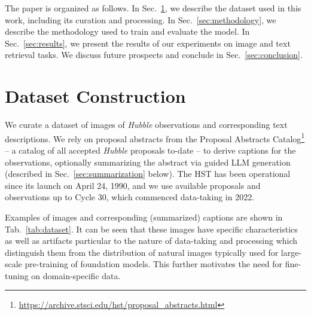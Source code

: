 \documentclass[10pt]{article} %
\newcommand{\SM}[1]{\textcolor{blue}{[SM: #1]}}
\newcommand{\hubble}{\emph{Hubble}\xspace}
\newcommand{\datafolder}[1]{\def\thedatafolder{#1}}
\begin{document}

The paper is organized as follows.
%
In Sec.~\ref{sec:dataset}, we describe the dataset used in this work, including its curation and processing.
%
In Sec.~\ref{sec:methodology}, we describe the methodology used to train and evaluate the model.
%
In Sec.~\ref{sec:results}, we present the results of our experiments on image and text retrieval tasks.
%
We discuss future prospects and conclude in Sec.~\ref{sec:conclusion}.

\section{Dataset Construction}
\label{sec:dataset}

We curate a dataset of images of \hubble observations and corresponding text descriptions.
%
We rely on proposal abstracts from the Proposal Abstracts Catalog\footnote{\url{https://archive.stsci.edu/hst/proposal_abstracts.html}} -- a catalog of all accepted \hubble proposals to-date -- to derive captions for the observations, optionally summarizing the abstract via guided LLM generation (described in Sec.~\ref{sec:summarization} below).
%
The HST has been operational since its launch on April 24, 1990, and we use available proposals and observations up to Cycle 30, which commenced data-taking in 2022.
%


Examples of images and corresponding (summarized) captions are shown in Tab.~\ref{tab:dataset}. %
%
It can be seen that these images have specific characteristics as well as artifacts particular to the nature of data-taking and processing which distinguish them from the distribution of natural images typically used for large-scale pre-training of foundation models.
%
This further motivates the need for fine-tuning on domain-specific data.


\datafolder{./plots/data/}
\end{document}
